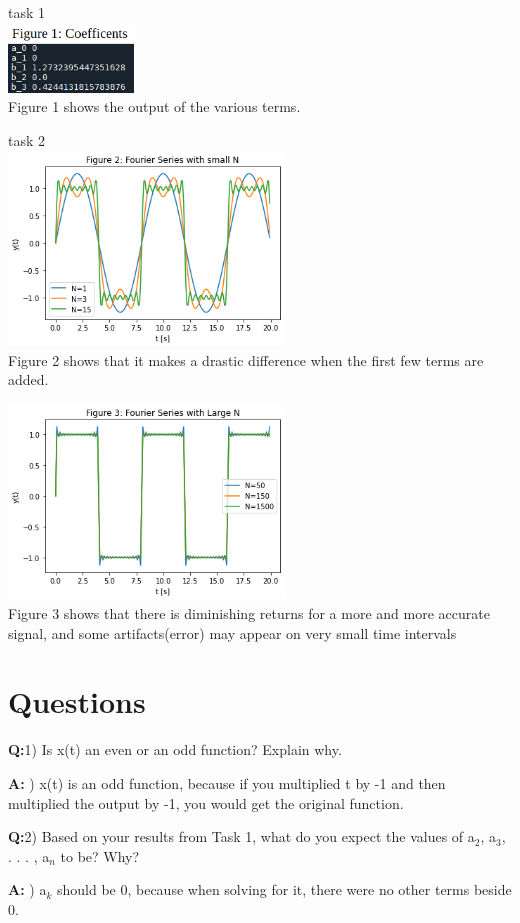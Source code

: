 \documentclass[12pt,a4paper]{article}
\newcommand{\Q}{\leavevmode\par\textbf {Q:}}
\newcommand{\A}{\par\textbf{A:} \normalfont}
\begin{document}
task 1\\
\includegraphics[width=0.25\textwidth]{Figure1.png}\\
Figure 1 shows the output of the various terms.

task 2\\
\includegraphics[width=0.55\textwidth]{Figure2.png}\\
Figure 2 shows that it makes a drastic difference when the first few terms are added.

\includegraphics[width=0.55\textwidth]{Figure3.png}\\
Figure 3 shows that there is diminishing returns for a more and more accurate signal, and some artifacts(error) may appear on very small time intervals




\section{Questions}\label{sec:res}

\Q 1) Is x(t) an even or an odd function? Explain why. 
\A 1) x(t) is an odd function, because if you multiplied t by -1 and then multiplied the output by -1, you would get the original function.

\Q 2) Based on your results from Task 1, what do you expect the values of a$_2$, a$_3$, . . . , a$_n$ to be? Why?
\A 2) a$_k$ should be 0, because when solving for it, there were no other terms beside 0.
\end{document}
